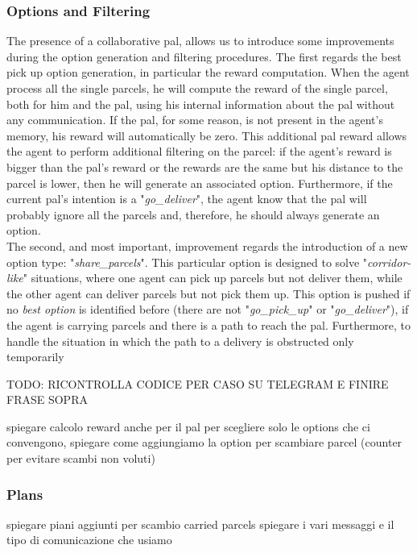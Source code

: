             \subsubsection{Options and Filtering}
                The presence of a collaborative pal, allows us to introduce some improvements during the option generation and filtering procedures. The first regards the best pick up option generation, in particular the reward computation. When the agent process all the single parcels, he will compute the reward of the single parcel, both for him and the pal, using his internal information about the pal without any communication. If the pal, for some reason, is not present in the agent's memory, his reward will automatically be zero. This additional pal reward allows the agent to perform additional filtering on the parcel: if the agent's reward is bigger than the pal's reward or the rewards are the same but his distance to the parcel is lower, then he will generate an associated option. Furthermore, if the current pal's intention is a "\textit{go\_deliver}", the agent know that the pal will probably ignore all the parcels and, therefore, he should always generate an option.
                \medskip\\
                The second, and most important, improvement regards the introduction of a new option type: "\textit{share\_parcels}". This particular option is designed to solve "\textit{corridor-like}" situations, where one agent can pick up parcels but not deliver them, while the other agent can deliver parcels but not pick them up. This option is pushed if no \textit{best option} is identified before (there are not "\textit{go\_pick\_up}" or "\textit{go\_deliver}"), if the agent is carrying parcels and there is a path to reach the pal. Furthermore, to handle the situation in which the path to a delivery is obstructed only temporarily

                TODO: RICONTROLLA CODICE PER CASO SU TELEGRAM E FINIRE FRASE SOPRA




            spiegare calcolo reward anche per il pal per scegliere solo le options che ci convengono, spiegare come aggiungiamo la option per scambiare parcel (counter per evitare scambi non voluti)
            
            \subsubsection{Plans}\label{shareRequest}
            spiegare piani aggiunti per scambio carried parcels
            spiegare i vari messaggi e il tipo di comunicazione che usiamo
            

        
